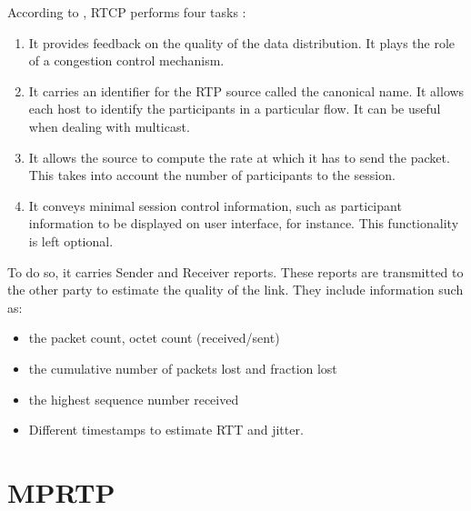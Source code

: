 According to \cite{javvin2005network}, RTCP performs four tasks : 

\begin{enumerate}
\item It provides feedback on the quality of the data distribution. It plays the role of a congestion control mechanism.
\item It carries an identifier for the RTP source called the canonical name. It allows each host to identify the participants in a particular flow. It can be useful when dealing with multicast.
\item It allows the source to compute the rate at which it has to send the packet. This takes into account the number of participants to the session.
\item It conveys minimal session control information, such as participant information to be displayed on user interface, for instance. This functionality is left optional.
\end{enumerate}

To do so, it carries Sender and Receiver reports. These reports are transmitted to the other party to estimate the quality of the link. They include information such as:

\begin{itemize}
\item the packet count, octet count (received/sent)
\item the cumulative number of packets lost and fraction lost
\item the highest sequence number received
\item Different timestamps to estimate RTT and jitter.
\end{itemize}


\section{MPRTP}


